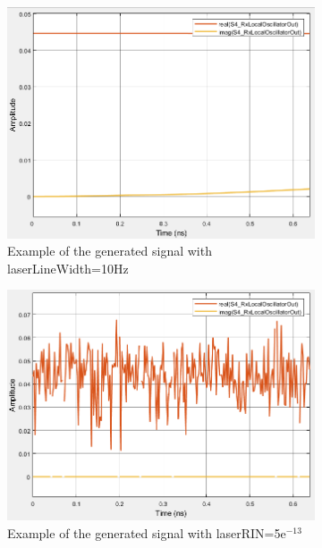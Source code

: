 \begin{figure}[H]
	\centering
        \begin{subfigure}{.55\textwidth}
        \centering
        	\includegraphics[scale=0.45]{./lib/local_oscillator/Figures/LineWidth_10.png}
        	\caption{Example of the generated signal \newline with laserLineWidth=10Hz }\label{Example_LineWidth}
        \end{subfigure}%
        \begin{subfigure}{.55\textwidth}
        \centering
        	\includegraphics[scale=0.45]{./lib/local_oscillator/Figures/RIN_5e-13.png}
        	\caption{Example of the generated signal with laserRIN=5e$^{-13}$ }\label{Example_RIN}
        \end{subfigure}
        \caption{}\label{Example_2}
\end{figure}

